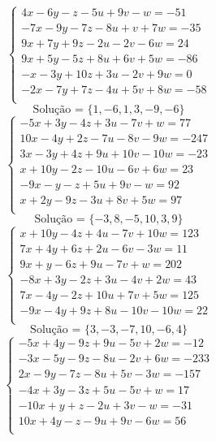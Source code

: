 \documentclass[12pt,oneside,a4paper]{article}
\begin{document}
\vspace{\baselineskip}
\begin{equation*}
\begin{cases}
4x-6y-z-5u+9v-w=-51 \\
-7x-9y-7z-8u+v+7w=-35 \\
9x+7y+9z-2u-2v-6w=24 \\
9x+5y-5z+8u+6v+5w=-86 \\
-x-3y+10z+3u-2v+9w=0 \\
-2x-7y+7z-4u+5v+8w=-58 \\
\end{cases}
\end{equation*}
\begin{equation*}
\text{Solução = }\{1,-6,1,3,-9,-6\}
\end{equation*}
\vspace{\baselineskip}
\begin{equation*}
\begin{cases}
-5x+3y-4z+3u-7v+w=77 \\
10x-4y+2z-7u-8v-9w=-247 \\
3x-3y+4z+9u+10v-10w=-23 \\
x+10y-2z-10u-6v+6w=23 \\
-9x-y-z+5u+9v-w=92 \\
x+2y-9z-3u+8v+5w=97 \\
\end{cases}
\end{equation*}
\begin{equation*}
\text{Solução = }\{-3,8,-5,10,3,9\}
\end{equation*}
\vspace{\baselineskip}
\begin{equation*}
\begin{cases}
x+10y-4z+4u-7v+10w=123 \\
7x+4y+6z+2u-6v-3w=11 \\
9x+y-6z+9u-7v+w=202 \\
-8x+3y-2z+3u-4v+2w=43 \\
7x-4y-2z+10u+7v+5w=125 \\
-9x-4y+9z+8u-10v-10w=22 \\
\end{cases}
\end{equation*}
\begin{equation*}
\text{Solução = }\{3,-3,-7,10,-6,4\}
\end{equation*}
\vspace{\baselineskip}
\begin{equation*}
\begin{cases}
-5x+4y-9z+9u-5v+2w=-12 \\
-3x-5y-9z-8u-2v+6w=-233 \\
2x-9y-7z-8u+5v-3w=-157 \\
-4x+3y-3z+5u-5v+w=17 \\
-10x+y+z-2u+3v-w=-31 \\
10x+4y-z-9u+9v-6w=56 \\
\end{cases}
\end{equation*}
\end{document}
